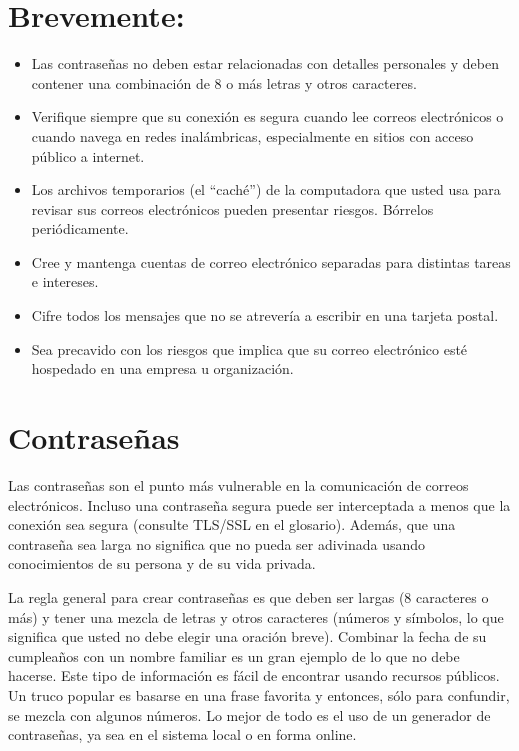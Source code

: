 \documentclass[10pt,a5paper,twoside,,]{book}
\providecommand{\tightlist}{%
  \setlength{\itemsep}{0pt}\setlength{\parskip}{0pt}}
\begin{document}
\section{Brevemente:}\label{brevemente}

\begin{itemize}
\tightlist
\item
  Las contraseñas no deben estar relacionadas con detalles personales y
  deben contener una combinación de 8 o más letras y otros caracteres.
\item
  Verifique siempre que su conexión es segura cuando lee correos
  electrónicos o cuando navega en redes inalámbricas, especialmente en
  sitios con acceso público a internet.
\item
  Los archivos temporarios (el ``caché'') de la computadora que usted
  usa para revisar sus correos electrónicos pueden presentar riesgos.
  Bórrelos periódicamente.
\item
  Cree y mantenga cuentas de correo electrónico separadas para distintas
  tareas e intereses.
\item
  Cifre todos los mensajes que no se atrevería a escribir en una tarjeta
  postal.
\item
  Sea precavido con los riesgos que implica que su correo electrónico
  esté hospedado en una empresa u organización.
\end{itemize}

\section{Contraseñas}\label{contraseuxf1as}

Las contraseñas son el punto más vulnerable en la comunicación de
correos electrónicos. Incluso una contraseña segura puede ser
interceptada a menos que la conexión sea segura (consulte TLS/SSL en el
glosario). Además, que una contraseña sea larga no significa que no
pueda ser adivinada usando conocimientos de su persona y de su vida
privada.

La regla general para crear contraseñas es que deben ser largas (8
caracteres o más) y tener una mezcla de letras y otros caracteres
(números y símbolos, lo que significa que usted no debe elegir una
oración breve). Combinar la fecha de su cumpleaños con un nombre
familiar es un gran ejemplo de lo que no debe hacerse. Este tipo de
información es fácil de encontrar usando recursos públicos. Un truco
popular es basarse en una frase favorita y entonces, sólo para
confundir, se mezcla con algunos números. Lo mejor de todo es el uso de
un generador de contraseñas, ya sea en el sistema local o en forma
online.
\end{document}

